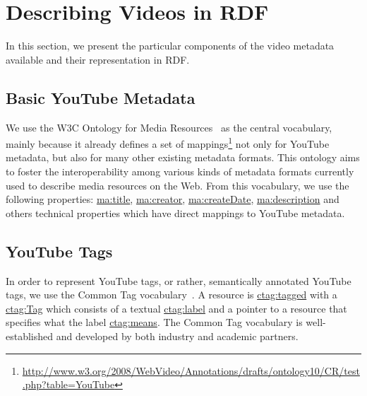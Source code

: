 \documentclass{acm_proc_article-sp}
\begin{document}

\section{Describing Videos in RDF}                                          \label{sec:representing}
In this section, we present the particular components of the video metadata available and their representation in RDF.

\subsection{Basic YouTube Metadata}                                         \label{sec:metadata}
We use the W3C Ontology for Media Resources~\cite{W3C:MediaOntology} as the central vocabulary, mainly because it
already defines a set of
mappings\footnote{\url{http://www.w3.org/2008/WebVideo/Annotations/drafts/ontology10/CR/test.php?table=YouTube}} not
only for YouTube metadata, but also for many other existing metadata formats. This ontology aims to foster the
interoperability among various kinds of metadata formats currently used to describe media resources on the Web. From
this vocabulary, we use the following properties: \url{ma:title}, \url{ma:creator}, \url{ma:createDate},
\url{ma:description} and others technical properties which have direct mappings to YouTube metadata.

\subsection{YouTube Tags}                                                   \label{sec:youtube}
In order to represent YouTube tags, or rather, semantically annotated YouTube tags, we use the Common Tag
vocabulary~\cite{CommonTag:Spec}. A resource is \url{ctag:tagged} with a \url{ctag:Tag} which consists of a textual
\url{ctag:label} and a pointer to a resource that specifies what the label \url{ctag:means}. The Common Tag vocabulary
is well-established and developed by both industry and academic partners.

\end{document}
